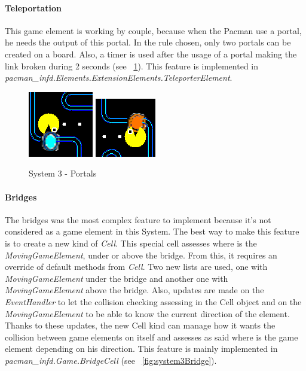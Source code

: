 \documentclass{article}
\begin{document}
\paragraph{Teleportation} This game element is working by couple, because when the Pacman use a portal, he needs the output of this portal. In the rule chosen, only two portals can be created on a board. Also, a timer is used after the usage of a portal making the link broken during 2 seconds (see ~\ref{fig:system3Portals}). This feature is implemented in \textit{pacman\_infd.Elements.ExtensionElements.TeleporterElement}. 

\begin{figure}
\centering
    \includegraphics[width=.3\linewidth]{imgs/portal1.PNG}
    \includegraphics[width=.3\linewidth]{imgs/portal2.PNG}
    \caption{System 3 - Portals}
    \label{fig:system3Portals}
\end{figure}

\paragraph{Bridges} The bridges was the most complex feature to implement because it's not considered as a game element in this System. The best way to make this feature is to create a new kind of \textit{Cell}. This special cell assesses where is the \textit{MovingGameElement}, under or above the bridge. From this, it requires an override of default methods from \textit{Cell}. Two new lists are used, one with \textit{MovingGameElement} under the bridge and another one with \textit{MovingGameElement} above the bridge. Also, updates are made on the \textit{EventHandler} to let the collision checking assessing in the Cell object and on the \textit{MovingGameElement} to be able to know the current direction of the element. Thanks to these updates, the new Cell kind can manage how it wants the collision between game elements on itself and assesses as said where is the game element depending on his direction. This feature is mainly implemented in \textit{pacman\_infd.Game.BridgeCell} (see ~\ref{fig:system3Bridge}).
\end{document}

